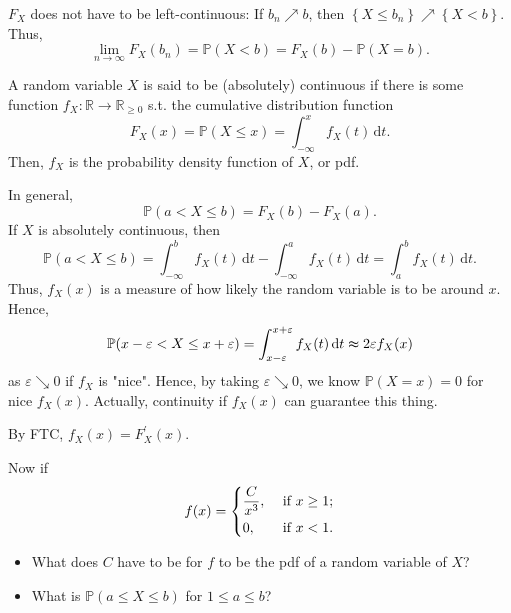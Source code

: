 \begin{note}
    \(F_X\) does not have to be left-continuous: If \(b_n \nearrow b\), then \(\left\{ X \le b_n \right\} \nearrow \left\{ X < b \right\}  \). Thus,
    \[
        \lim_{n \to \infty} F_X(b_n) = \mathbb{P} (X < b) = F_X(b) - \mathbb{P} (X = b). 
    \] 
\end{note}

\begin{definition}
    A random variable \(X\) is said to be (absolutely) continuous if there is some function \(f_X: \mathbb{R} \to \mathbb{R} _{\ge 0}\) s.t. the cumulative distribution function 
    \[
        F_X(x) = \mathbb{P} (X \le x) = \int _{-\infty }^x f_X(t) \, \mathrm{d} t. 
    \] 
    Then, \(f_X\) is the probability density function of \(X\), or pdf.   
\end{definition}

\begin{remark}
    In general,
    \[
        \mathbb{P} (a < X \le b) = F_X(b) - F_X(a).
    \]
    If \(X\) is absolutely continuous, then 
    \[
        \mathbb{P} (a < X \le b) = \int _{-\infty }^b f_X(t) \, \mathrm{d} t - \int _{-\infty }^a f_X(t) \, \mathrm{d} t = \int _a^b f_X(t) \, \mathrm{d} t.  
    \] 
    Thus, \(f_X(x)\) is a measure of how likely the random variable is to be around \(x\). Hence,
    \[
        \mathbb{P} (x - \varepsilon < X \le x + \varepsilon) = \int _{x - \varepsilon}^{x + \varepsilon } f_X(t) \, \mathrm{d} t \thickapprox 2 \varepsilon f_X(x) 
    \]  
    as \(\varepsilon \searrow 0\) if \(f_X\) is "nice". Hence, by taking \(\varepsilon \searrow 0\), we know \(\mathbb{P} (X = x) = 0\) for nice \(f_X(x)\). Actually, continuity if \(f_X(x)\) can guarantee this thing.     
\end{remark}

\begin{remark}
    By FTC, \(f_X(x) = F_X^{\prime} (x)\). 
\end{remark}

\begin{eg}
    Now if 
    \[
        f(x) = \begin{dcases}
            \frac{C}{x^3}, &\text{ if } x \ge 1 ;\\
            0, &\text{ if } x < 1.
        \end{dcases}
    \]
    \begin{itemize}
        \item [(a)] What does \(C\) have to be for \(f\) to be the pdf of a random variable of \(X\)? 
        \item [(b)] What is \(\mathbb{P} (a \le X \le b)\) for \(1 \le a \le b\)?      
    \end{itemize}
\end{eg}

